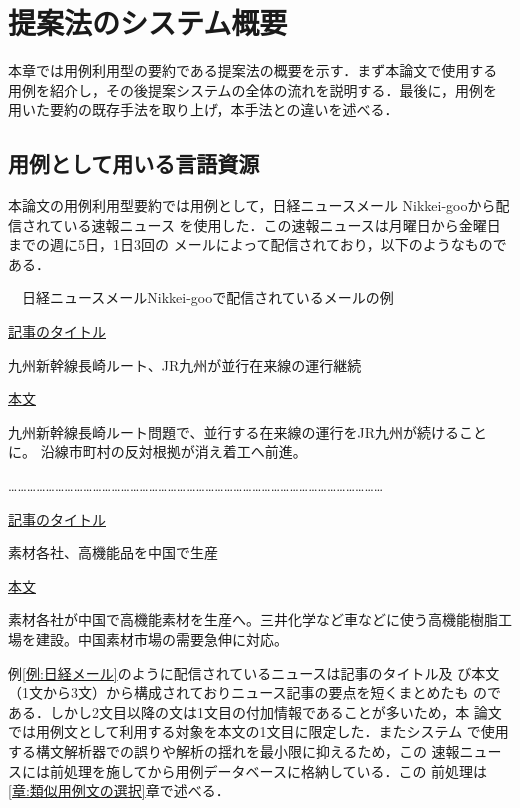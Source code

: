 \documentclass[japanese]{jnlp_1.4}
\newcounter{exp}
\def\exp#1{}
\def\toolref#1{}
\begin{document}
\section{提案法のシステム概要}\label{章:提案法のシステム概要}

本章では用例利用型の要約である提案法の概要を示す．まず本論文で使用する
用例を紹介し，その後提案システムの全体の流れを説明する．最後に，用例を
用いた要約の既存手法を取り上げ，本手法との違いを述べる．

\subsection{用例として用いる言語資源}\label{節:用例として用いる言語資源}

本論文の用例利用型要約では用例として，日経ニュースメール
Nikkei-goo\toolref{言語資源:nikkei-goo}から配信されている速報ニュース
を使用した．この速報ニュースは月曜日から金曜日までの週に5日，1日3回の
メールによって配信されており，以下のようなものである．

\begin{screen}
\exp{例:日経メール}　日経ニュースメールNikkei-gooで配信されているメールの例


\ul{記事のタイトル}

{\setlength{\leftskip}{1zw}
九州新幹線長崎ルート、JR九州が並行在来線の運行継続
\par}

\ul{本文}

{\setlength{\leftskip}{1zw}
九州新幹線長崎ルート問題で、並行する在来線の運行をJR九州が続けることに。
沿線市町村の反対根拠が消え着工へ前進。
\par}

…………………………………………………………………………………………………………

\ul{記事のタイトル}

{\setlength{\leftskip}{1zw}
素材各社、高機能品を中国で生産
\par}

\ul{本文}

{\setlength{\leftskip}{1zw}
素材各社が中国で高機能素材を生産へ。三井化学など車などに使う高機能樹脂工
場を建設。中国素材市場の需要急伸に対応。
\par}
\end{screen}

例\ref{例:日経メール}のように配信されているニュースは記事のタイトル及
び本文（1文から3文）から構成されておりニュース記事の要点を短くまとめたも
のである．しかし2文目以降の文は1文目の付加情報であることが多いため，本
論文では用例文として利用する対象を本文の1文目に限定した．またシステム
で使用する構文解析器での誤りや解析の揺れを最小限に抑えるため，この
速報ニュースには前処理を施してから用例データベースに格納している．この
前処理は \ref {章:類似用例文の選択}章で述べる．
\end{document}
